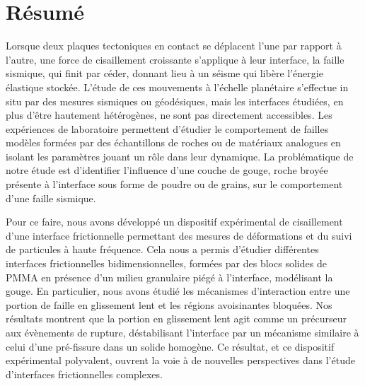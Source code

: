 { \let\cleardoublepage\relax\chapter*{Résumé}}


Lorsque deux plaques tectoniques en contact se déplacent l'une par rapport à l'autre, une force de cisaillement croissante s'applique à leur interface, la faille sismique, qui finit par céder, donnant lieu à un séisme qui libère l'énergie élastique stockée. L'étude de ces mouvements à l'échelle planétaire s'effectue in situ par des mesures sismiques ou géodésiques, mais les interfaces étudiées, en plus d'être hautement hétérogènes, ne sont pas directement accessibles. Les expériences de laboratoire permettent d'étudier le comportement de failles modèles formées par des échantillons de roches ou de matériaux analogues en isolant les paramètres jouant un rôle dans leur dynamique. La problématique de notre étude est d'identifier l'influence d'une couche de gouge, roche broyée présente à l'interface sous forme de poudre ou de grains, sur le comportement d'une faille sismique.

Pour ce faire, nous avons développé un dispositif expérimental de cisaillement d'une interface frictionnelle permettant des mesures de déformations et du suivi de particules à haute fréquence. Cela nous a permis d'étudier différentes interfaces frictionnelles bidimensionnelles, formées par des blocs solides de PMMA en présence d'un milieu granulaire piégé à l'interface, modélisant la gouge. En particulier, nous avons étudié les mécanismes d'interaction entre une portion de faille en glissement lent et les régions avoisinantes bloquées. Nos résultats montrent que la portion en glissement lent agit comme un précurseur aux évènements de rupture, déstabilisant l'interface par un mécanisme similaire à celui d'une pré-fissure dans un solide homogène. Ce résultat, et ce dispositif expérimental polyvalent, ouvrent la voie à de nouvelles perspectives dans l'étude d'interfaces frictionnelles complexes.
